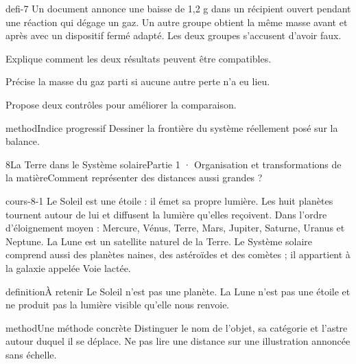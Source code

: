 \documentclass[12pt,twoside,openany]{book}
\begin{document}
\label{defi-ex-7}
\begin{pcFiche}{defi-7}
Un document annonce une baisse de 1,2 g dans un récipient ouvert pendant une réaction qui dégage un gaz. Un autre groupe obtient la même masse avant et après avec un dispositif fermé adapté. Les deux groupes s’accusent d’avoir faux.\par
{}
\begin{questions}
\item Explique comment les deux résultats peuvent être compatibles.
\item Précise la masse du gaz parti si aucune autre perte n’a eu lieu.
\item Propose deux contrôles pour améliorer la comparaison.
\end{questions}
\begin{pcEncadre}{method}{Indice progressif}
Dessiner la frontière du système réellement posé sur la balance.\par
\end{pcEncadre}
\end{pcFiche}
\clearpage\pagestyle{otMain}
\begin{ouverture}[college1]{8}{La Terre dans le Système solaire}{Partie 1 · Organisation et transformations de la matière}{Comment représenter des distances aussi grandes ?}
\end{ouverture}
\label{ch-8-cours-1}
\label{ess-8}
\begin{pcFiche}{cours-8-1}
Le Soleil est une étoile : il émet sa propre lumière. Les huit planètes tournent autour de lui et diffusent la lumière qu’elles reçoivent. Dans l’ordre d’éloignement moyen : Mercure, Vénus, Terre, Mars, Jupiter, Saturne, Uranus et Neptune. La Lune est un satellite naturel de la Terre. Le Système solaire comprend aussi des planètes naines, des astéroïdes et des comètes ; il appartient à la galaxie appelée Voie lactée.\par
{}
\begin{pcEncadre}{definition}{À retenir}
Le Soleil n’est pas une planète. La Lune n’est pas une étoile et ne produit pas la lumière visible qu’elle nous renvoie.\par
\end{pcEncadre}
\begin{pcEncadre}{method}{Une méthode concrète}
Distinguer le nom de l’objet, sa catégorie et l’astre autour duquel il se déplace. Ne pas lire une distance sur une illustration annoncée sans échelle.\par
\end{pcEncadre}
\end{pcFiche}
\end{document}
